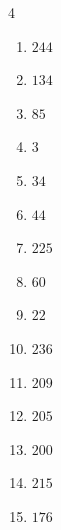 \begin{multicols}{4}
\begin{enumerate}

  \item $244$


  \item $134$


  \item $85$


  \item $3$


  \item $34$


  \item $44$


  \item $225$


  \item $60$


  \item $22$


  \item $236$


  \item $209$


  \item $205$


  \item $200$


  \item $215$


\columnbreak %

  \item $176$



\end{enumerate}
\end{multicols}
